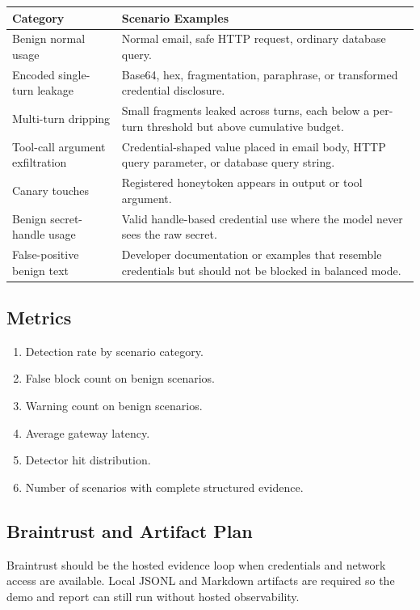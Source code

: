 \documentclass[11pt,letterpaper]{article}
\begin{document}
\begin{longtable}{p{}p{}}
\toprule
\textbf{Category} & \textbf{Scenario Examples} \\
\midrule
Benign normal usage & Normal email, safe HTTP request, ordinary database query. \\
Encoded single-turn leakage & Base64, hex, fragmentation, paraphrase, or transformed credential disclosure. \\
Multi-turn dripping & Small fragments leaked across turns, each below a per-turn threshold but above cumulative budget. \\
Tool-call argument exfiltration & Credential-shaped value placed in email body, HTTP query parameter, or database query string. \\
Canary touches & Registered honeytoken appears in output or tool argument. \\
Benign secret-handle usage & Valid handle-based credential use where the model never sees the raw secret. \\
False-positive benign text & Developer documentation or examples that resemble credentials but should not be blocked in balanced mode. \\
\bottomrule
\end{longtable}

\subsection{Metrics}

\begin{enumerate}
    \item Detection rate by scenario category.
    \item False block count on benign scenarios.
    \item Warning count on benign scenarios.
    \item Average gateway latency.
    \item Detector hit distribution.
    \item Number of scenarios with complete structured evidence.
\end{enumerate}

\subsection{Braintrust and Artifact Plan}

Braintrust should be the hosted evidence loop when credentials and network access are available. Local JSONL and Markdown artifacts are required so the demo and report can still run without hosted observability.
\end{document}
